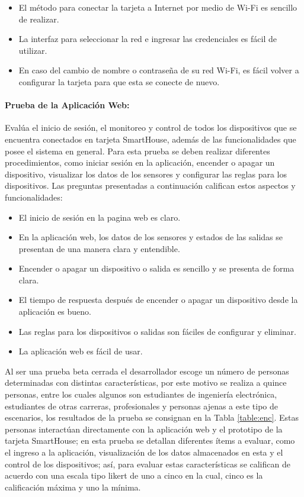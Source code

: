 \begin{itemize}
\item El método para conectar la tarjeta a Internet por medio de Wi-Fi es sencillo de realizar.
\item La interfaz para seleccionar la red e ingresar las credenciales es fácil de utilizar.
\item En caso del cambio de nombre o contraseña de su red Wi-Fi, es fácil volver a configurar la tarjeta para que esta se conecte de nuevo.
\end{itemize}

\paragraph{Prueba de la Aplicación Web:} Evalúa el inicio de sesión, el monitoreo y control de todos los dispositivos que se encuentra conectados en tarjeta SmartHouse, además de las funcionalidades que posee el sistema en general. Para esta prueba se deben realizar diferentes procedimientos, como iniciar sesión en la aplicación, encender o apagar un dispositivo, visualizar los datos de los sensores y configurar las reglas para los dispositivos. Las preguntas presentadas a continuación califican estos aspectos y funcionalidades:\\

\begin{itemize}
	\item El inicio de sesión en la pagina web es claro.
	\item En la aplicación web, los datos de los sensores y estados de las salidas se presentan de una manera clara y entendible.
	\item Encender o apagar un dispositivo o salida es sencillo y se presenta de forma clara.
	\item El tiempo de respuesta después de encender o apagar un dispositivo desde la aplicación es bueno.
	\item Las reglas para los dispositivos o salidas son fáciles de configurar y eliminar.
	\item La aplicación web es fácil de usar.
\end{itemize}

Al ser una prueba beta cerrada el desarrollador escoge un número de personas determinadas con distintas características, por este motivo se realiza a quince personas, entre los cuales algunos son estudiantes de ingeniería electrónica, estudiantes de otras carreras, profesionales y personas ajenas a este tipo de escenarios, los resultados de la prueba se consignan en la Tabla \ref{table:enc}. Estas personas interactúan directamente con la aplicación web y el prototipo de la tarjeta SmartHouse; en esta prueba se detallan diferentes ítems a evaluar, como el ingreso a la aplicación, visualización de los datos almacenados en esta y el control de los dispositivos; así, para evaluar estas características se califican de acuerdo con una escala tipo likert \cite{lik} de uno a cinco en la cual, cinco es la calificación máxima y uno la mínima.\\


